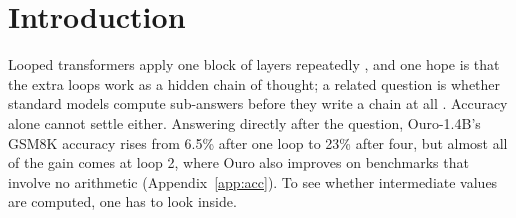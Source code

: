 \documentclass{article}
\begin{document}
\begin{abstract}
the answer to the one a carried sub-answer predicts in 0.2--0.3\% of pairs, against 88--90\% for an operand's own token, so the sub-answer is not carried on its own past its equation, consistent with the claim. In pairs whose answers differ it gives the partner's answer in 8\% (above zero, below our bar), so a weak carry of the answer before it is written is not ruled out; a post hoc map places most of it at ``='', the last of the five. A probe could not have shown which positions are used; with a chain the protocol cannot tell.
\end{abstract}

\section{Introduction}\label{sec:intro}

Looped transformers apply one block of layers repeatedly \citep{geiping2025,zhu2025ouro}, and one hope is that the extra loops work as a hidden chain of thought; a related question is whether standard models compute sub-answers before they write a chain at all \citep{kudo2026}. Accuracy alone cannot settle either. Answering directly after the question, Ouro-1.4B's GSM8K accuracy rises from 6.5\% after one loop to 23\% after four, but almost all of the gain comes at loop 2, where Ouro also improves on benchmarks that involve no arithmetic (Appendix~\ref{app:acc}). To see whether intermediate values are computed, one has to look inside.
\end{document}
